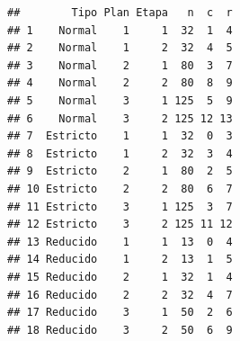 \documentclass[
  12pt,
]{article}
\begin{document}
\begin{verbatim}
##        Tipo Plan Etapa   n  c  r
## 1    Normal    1     1  32  1  4
## 2    Normal    1     2  32  4  5
## 3    Normal    2     1  80  3  7
## 4    Normal    2     2  80  8  9
## 5    Normal    3     1 125  5  9
## 6    Normal    3     2 125 12 13
## 7  Estricto    1     1  32  0  3
## 8  Estricto    1     2  32  3  4
## 9  Estricto    2     1  80  2  5
## 10 Estricto    2     2  80  6  7
## 11 Estricto    3     1 125  3  7
## 12 Estricto    3     2 125 11 12
## 13 Reducido    1     1  13  0  4
## 14 Reducido    1     2  13  1  5
## 15 Reducido    2     1  32  1  4
## 16 Reducido    2     2  32  4  7
## 17 Reducido    3     1  50  2  6
## 18 Reducido    3     2  50  6  9
\end{verbatim}
\end{document}
